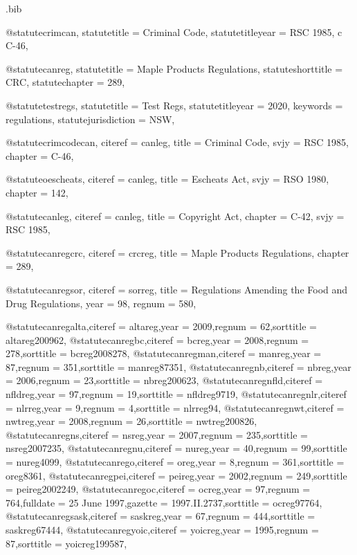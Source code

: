 \begin{filecontents*}{\jobname.bib}

@statute{crimcan,
statutetitle = {Criminal Code},
statutetitleyear = {RSC 1985, c C-46},%
}


@statute{canreg,
statutetitle = {Maple Products Regulations},
statuteshorttitle = {CRC},
statutechapter = {289},
}

@statute{testregs,
statutetitle = {Test Regs},
statutetitleyear = {2020},%
keywords = {regulations},
statutejurisdiction = {NSW},
}




@statute{crimcodecan,
citeref = {canleg},
title = {Criminal Code},
svjy = {RSC 1985},
chapter = {C-46},
}


@statute{oescheats,
citeref = {canleg},
title = {Escheats Act},
svjy = {RSO 1980},
chapter = {142},
}

@statute{canleg,
citeref = {canleg},
title = {Copyright Act},
chapter = {C-42},
svjy = {RSC 1985},
}

@statute{canregcrc,
citeref = {crcreg},
title = {Maple Products Regulations},
chapter = {289},
}


@statute{canregsor,
citeref = {sorreg},
title = {Regulations Amending the Food and Drug Regulations},
year = {98},
regnum = {580},
}

@statute{canregalta,citeref = {altareg},year = {2009},regnum = {62},sorttitle = {altareg200962},}
@statute{canregbc,citeref = {bcreg},year = {2008},regnum = {278},sorttitle = {bcreg2008278},}
@statute{canregman,citeref = {manreg},year = {87},regnum = {351},sorttitle = {manreg87351},}
@statute{canregnb,citeref = {nbreg},year = {2006},regnum = {23},sorttitle = {nbreg200623},}
@statute{canregnfld,citeref = {nfldreg},year = {97},regnum = {19},sorttitle = {nfldreg9719},}
@statute{canregnlr,citeref = {nlrreg},year = {9},regnum = {4},sorttitle = {nlrreg94},}
@statute{canregnwt,citeref = {nwtreg},year = {2008},regnum = {26},sorttitle = {nwtreg200826},}
@statute{canregns,citeref = {nsreg},year = {2007},regnum = {235},sorttitle = {nsreg2007235},}
@statute{canregnu,citeref = {nureg},year = {40},regnum = {99},sorttitle = {nureg4099},}
@statute{canrego,citeref = {oreg},year = {8},regnum = {361},sorttitle = {oreg8361},}
@statute{canregpei,citeref = {peireg},year = {2002},regnum = {249},sorttitle = {peireg2002249},}
@statute{canregoc,citeref = {ocreg},year = {97},regnum = {764},fulldate = {25 June 1997},gazette = { 1997.II.2737},sorttitle = {ocreg97764},}
@statute{canregsask,citeref = {saskreg},year = {67},regnum = {444},sorttitle = {saskreg67444},}
@statute{canregyoic,citeref = {yoicreg},year = {1995},regnum = {87},sorttitle = {yoicreg199587},}



\end{filecontents*}
